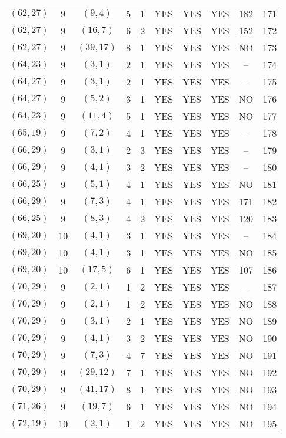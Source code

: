 \begin{longtable}{|c|c|c|c|c|c|c|c|c|c|}
$(62, 27)$ & 9 & $(9, 4)$ & 5 & 1 & YES & YES & YES & 182 & 171\\
$(62, 27)$ & 9 & $(16, 7)$ & 6 & 2 & YES & YES & YES & 152 & 172\\
$(62, 27)$ & 9 & $(39, 17)$ & 8 & 1 & YES & YES & YES & NO & 173\\
$(64, 23)$ & 9 & $(3, 1)$ & 2 & 1 & YES & YES & YES & -- & 174\\
$(64, 27)$ & 9 & $(3, 1)$ & 2 & 1 & YES & YES & YES & -- & 175\\
$(64, 27)$ & 9 & $(5, 2)$ & 3 & 1 & YES & YES & YES & NO & 176\\
$(64, 23)$ & 9 & $(11, 4)$ & 5 & 1 & YES & YES & YES & NO & 177\\
$(65, 19)$ & 9 & $(7, 2)$ & 4 & 1 & YES & YES & YES & -- & 178\\
$(66, 29)$ & 9 & $(3, 1)$ & 2 & 3 & YES & YES & YES & -- & 179\\
$(66, 29)$ & 9 & $(4, 1)$ & 3 & 2 & YES & YES & YES & -- & 180\\
$(66, 25)$ & 9 & $(5, 1)$ & 4 & 1 & YES & YES & YES & NO & 181\\
$(66, 29)$ & 9 & $(7, 3)$ & 4 & 1 & YES & YES & YES & 171 & 182\\
$(66, 25)$ & 9 & $(8, 3)$ & 4 & 2 & YES & YES & YES & 120 & 183\\
$(69, 20)$ & 10 & $(4, 1)$ & 3 & 1 & YES & YES & YES & -- & 184\\
$(69, 20)$ & 10 & $(4, 1)$ & 3 & 1 & YES & YES & YES & NO & 185\\
$(69, 20)$ & 10 & $(17, 5)$ & 6 & 1 & YES & YES & YES & 107 & 186\\
$(70, 29)$ & 9 & $(2, 1)$ & 1 & 2 & YES & YES & YES & -- & 187\\
$(70, 29)$ & 9 & $(2, 1)$ & 1 & 2 & YES & YES & YES & NO & 188\\
$(70, 29)$ & 9 & $(3, 1)$ & 2 & 1 & YES & YES & YES & NO & 189\\
$(70, 29)$ & 9 & $(4, 1)$ & 3 & 2 & YES & YES & YES & NO & 190\\
$(70, 29)$ & 9 & $(7, 3)$ & 4 & 7 & YES & YES & YES & NO & 191\\
$(70, 29)$ & 9 & $(29, 12)$ & 7 & 1 & YES & YES & YES & NO & 192\\
$(70, 29)$ & 9 & $(41, 17)$ & 8 & 1 & YES & YES & YES & NO & 193\\
$(71, 26)$ & 9 & $(19, 7)$ & 6 & 1 & YES & YES & YES & NO & 194\\
$(72, 19)$ & 10 & $(2, 1)$ & 1 & 2 & YES & YES & YES & NO & 195\\

\end{longtable}
